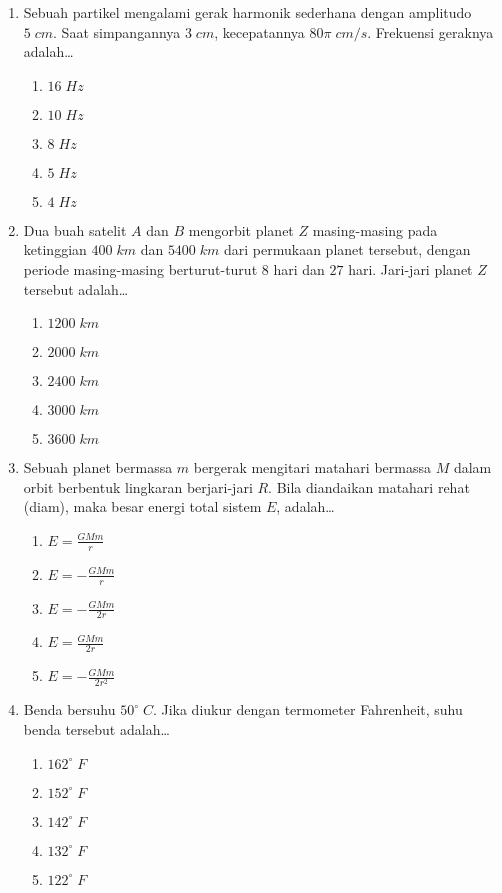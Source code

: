 \documentclass[A4,12PT, english, twocolumn]{journal}
\begin{document}
\begin{enumerate}
\item Sebuah partikel mengalami gerak harmonik sederhana dengan amplitudo $5 \; cm$. Saat simpangannya $3 \; cm$, kecepatannya $80\pi \; cm/s$. Frekuensi geraknya adalah\dots
    \begin{enumerate}
        \item $16 \; Hz$
        \item $10 \; Hz$
        \item $8 \; Hz$
        \item $5 \; Hz$
        \item $4 \; Hz$
    \end{enumerate}

\item Dua buah satelit $A$ dan $B$ mengorbit planet $Z$ masing-masing pada ketinggian $400 \; km$ dan $5400 \; km$ dari permukaan planet tersebut, dengan periode masing-masing berturut-turut $8$ hari dan $27$ hari. Jari-jari planet $Z$ tersebut adalah\dots
    \begin{enumerate}
        \item $1200 \; km$
        \item $2000 \; km$
        \item $2400\; km$
        \item $3000 \; km$
        \item $3600 \; km$
    \end{enumerate}
 
\item Sebuah planet bermassa $m$ bergerak mengitari matahari bermassa $M$ dalam orbit berbentuk lingkaran berjari-jari $R$. Bila diandaikan matahari rehat (diam), maka besar energi total sistem $E$, adalah\dots
    \begin{enumerate}
        \item $E= \frac{GMm}{r}$
        \item $E= -\frac{GMm}{r}$
        \item $E= -\frac{GMm}{2r}$
        \item $E= \frac{GMm}{2r}$
        \item $E= -\frac{GMm}{2r^2}$
    \end{enumerate}

\item Benda bersuhu $50^\circ \; C$. Jika diukur dengan termometer Fahrenheit, suhu benda tersebut adalah\dots
    \begin{enumerate}
        \item $162^\circ \; F$
        \item $152^\circ \; F$
        \item $142^\circ \; F$
        \item $132^\circ \; F$
        \item $122^\circ \; F$
    \end{enumerate}


\end{enumerate}
\end{document}
